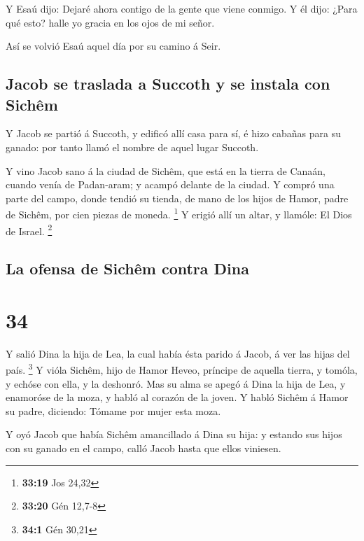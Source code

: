  Y Esaú dijo: Dejaré ahora contigo de la gente que viene
conmigo. Y él dijo: ¿Para qué esto? halle yo gracia en los ojos de mi
señor.

 Así se volvió Esaú aquel día por su camino á Seir.

\hypertarget{jacob-se-traslada-a-succoth-y-se-instala-con-sichuxeam}{%
\subsection{Jacob se traslada a Succoth y se instala con
Sichêm}\label{jacob-se-traslada-a-succoth-y-se-instala-con-sichuxeam}}

 Y Jacob se partió á Succoth, y edificó allí casa para
sí, é hizo cabañas para su ganado: por tanto llamó el nombre de aquel
lugar Succoth.

 Y vino Jacob sano á la ciudad de Sichêm, que está en la
tierra de Canaán, cuando venía de Padan-aram; y acampó delante de la
ciudad.  Y compró una parte del campo, donde tendió su
tienda, de mano de los hijos de Hamor, padre de Sichêm, por cien piezas
de moneda. \footnote{\textbf{33:19} Jos 24,32}  Y erigió
allí un altar, y llamóle: El Dios de Israel. \footnote{\textbf{33:20}
  Gén 12,7-8}

\hypertarget{la-ofensa-de-sichuxeam-contra-dina}{%
\subsection{La ofensa de Sichêm contra
Dina}\label{la-ofensa-de-sichuxeam-contra-dina}}

\hypertarget{section-33}{%
\section{34}\label{section-33}}

 Y salió Dina la hija de Lea, la cual había ésta parido á
Jacob, á ver las hijas del país. \footnote{\textbf{34:1} Gén 30,21}
 Y vióla Sichêm, hijo de Hamor Heveo, príncipe de aquella
tierra, y tomóla, y echóse con ella, y la deshonró.  Mas
su alma se apegó á Dina la hija de Lea, y enamoróse de la moza, y habló
al corazón de la joven.  Y habló Sichêm á Hamor su padre,
diciendo: Tómame por mujer esta moza.

 Y oyó Jacob que había Sichêm amancillado á Dina su hija:
y estando sus hijos con su ganado en el campo, calló Jacob hasta que
ellos viniesen.

